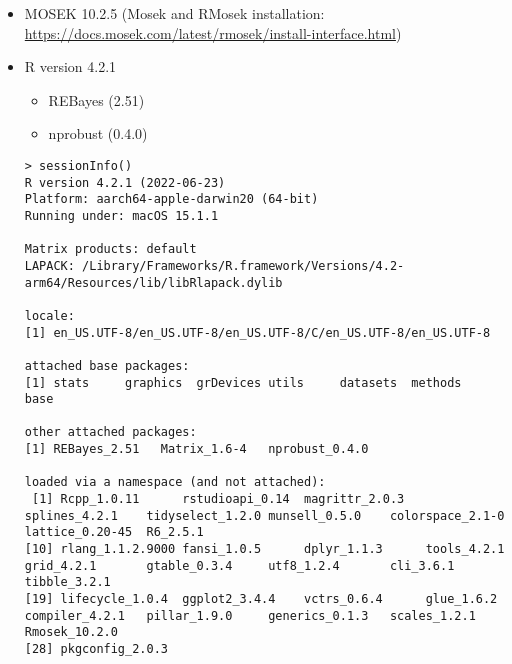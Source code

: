 \documentclass[10pt]{article}
\providecommand{\tightlist}{%
  \setlength{\itemsep}{0pt}\setlength{\parskip}{0pt}}
\begin{document}
\begin{itemize}
\item MOSEK 10.2.5 (Mosek and RMosek installation: \url{https://docs.mosek.com/latest/rmosek/install-interface.html})
\item
  R version 4.2.1
  \begin{itemize}
    \item REBayes (2.51)
  
    \item nprobust (0.4.0)
  \end{itemize}

{\scriptsize  \begin{verbatim}
> sessionInfo()
R version 4.2.1 (2022-06-23)
Platform: aarch64-apple-darwin20 (64-bit)
Running under: macOS 15.1.1

Matrix products: default
LAPACK: /Library/Frameworks/R.framework/Versions/4.2-arm64/Resources/lib/libRlapack.dylib

locale:
[1] en_US.UTF-8/en_US.UTF-8/en_US.UTF-8/C/en_US.UTF-8/en_US.UTF-8

attached base packages:
[1] stats     graphics  grDevices utils     datasets  methods   base

other attached packages:
[1] REBayes_2.51   Matrix_1.6-4   nprobust_0.4.0

loaded via a namespace (and not attached):
 [1] Rcpp_1.0.11      rstudioapi_0.14  magrittr_2.0.3   splines_4.2.1    tidyselect_1.2.0 munsell_0.5.0    colorspace_2.1-0 lattice_0.20-45  R6_2.5.1
[10] rlang_1.1.2.9000 fansi_1.0.5      dplyr_1.1.3      tools_4.2.1      grid_4.2.1       gtable_0.3.4     utf8_1.2.4       cli_3.6.1        tibble_3.2.1
[19] lifecycle_1.0.4  ggplot2_3.4.4    vctrs_0.6.4      glue_1.6.2       compiler_4.2.1   pillar_1.9.0     generics_0.1.3   scales_1.2.1     Rmosek_10.2.0
[28] pkgconfig_2.0.3
  \end{verbatim}
}
\end{itemize}
\end{document}
